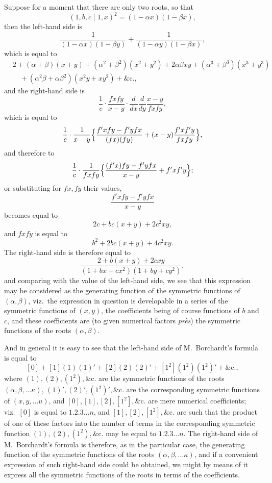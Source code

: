 \documentclass[11pt]{article}
\begin{document}
Suppose for a moment that there are only two roots, so that
\[
(1, b, c \mid 1, x)^2 = (1 - \alpha x)(1 - \beta x),
\]
then the left-hand side is
\[
\frac{1}{(1 - \alpha x)(1 - \beta y)} + \frac{1}{(1 - \alpha y)(1 - \beta x)},
\]
which is equal to
\begin{align*}
&2 + (\alpha + \beta)(x + y) + (\alpha^2 + \beta^2)(x^2 + y^2) + 2\alpha\beta x y + (\alpha^3 + \beta^3)(x^3 + y^3) \\
&\quad + (\alpha^2\beta + \alpha\beta^2)(x^2 y + x y^2) + \&\text{c.},
\end{align*}
and the right-hand side is
\[
\frac{1}{c}\cdot\frac{f x f y}{x - y}\cdot\frac{d}{dx}\frac{d}{dy}\frac{x - y}{f x f y},
\]
which is equal to
\[
\frac{1}{c}\cdot\frac{1}{x - y}\Bigl\{\frac{f'x f y - f'y f x}{(f x)(f y)} + (x - y)\frac{f'x f'y}{f x f y}\Bigr\},
\]
and therefore to
\[
\frac{1}{c}\cdot\frac{1}{f x f y}\Bigl\{\frac{(f'x)f y - f'y f x}{x - y} + f' x f' y\Bigr\};
\]
or substituting for $f x, f y$ their values,
\[
\frac{f'x f y - f'y f x}{x - y}
\]
becomes equal to
\[
2 c + b c(x + y) + 2 c^2 x y,
\]
and $f x f y$ is equal to
\[
b^2 + 2 b c(x + y) + 4 c^2 x y.
\]
The right-hand side is therefore equal to
\[
\frac{2 + b(x + y) + 2 c x y}{(1 + b x + c x^2)(1 + b y + c y^2)},
\]
and comparing with the value of the left-hand side, we see that this expression may be considered as the generating function of the symmetric functions of $(\alpha, \beta)$, viz.\ the expression in question is developable in a series of the symmetric functions of $(x, y)$, the coefficients being of course functions of $b$ and $c$, and these coefficients are (to given numerical factors \textit{pr\`es}) the symmetric functions of the roots $(\alpha, \beta)$.

And in general it is easy to see that the left-hand side of M.~Borchardt's formula is equal to
\[
[0] + [1](1)(1)' + [2](2)(2)' + [1^2](1^2)(1^2)' + \&\text{c.},
\]
where $(1), (2), (1^2), \&\text{c.}$ are the symmetric functions of the roots $(\alpha, \beta, \ldots\kappa)$, $(1)', (2)', (1^2)', \&\text{c.}$ are the corresponding symmetric functions of $(x, y, \ldots u)$, and $[0], [1], [2], [1^2], \&\text{c.}$ are mere numerical coefficients; viz.\ $[0]$ is equal to $1.2.3\ldots n$, and $[1], [2], [1^2], \&\text{c.}$ are such that the product of one of these factors into the number of terms in the corresponding symmetric function $(1), (2), (1^2), \&\text{c.}$ may be equal to $1.2.3\ldots n$. The right-hand side of M.~Borchardt's formula is therefore, as in the particular case, the generating function of the symmetric functions of the roots $(\alpha, \beta, \ldots\kappa)$, and if a convenient expression of such right-hand side could be obtained, we might by means of it express all the symmetric functions of the roots in terms of the coefficients.
\end{document}
